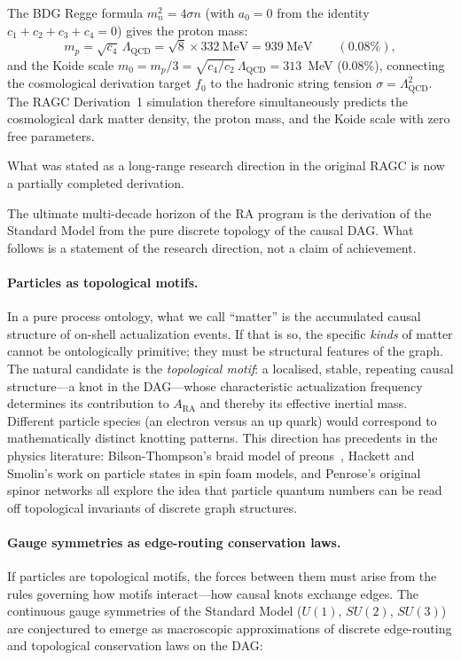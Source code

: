 \documentclass[11pt,a4paper]{article}
\theoremstyle{plain}
\theoremstyle{definition}
\theoremstyle{remark}
\begin{document}
The BDG Regge formula $m_n^2 = 4\sigma n$ (with $a_0=0$ from the identity
$c_1+c_2+c_3+c_4=0$) gives the proton mass:
\begin{equation}
  m_p = \sqrt{c_4}\,\Lambda_{\mathrm{QCD}} = \sqrt{8}\times 332~\mathrm{MeV}
  = 939~\mathrm{MeV} \qquad (0.08\%),
\end{equation}
and the Koide scale $m_0 = m_p/3 = \sqrt{c_4/c_2}\,\Lambda_{\mathrm{QCD}} = 313$~MeV ($0.08\%$),
connecting the cosmological derivation target $f_0$ to the hadronic string
tension $\sigma = \Lambda_{\mathrm{QCD}}^2$. The RAGC Derivation~1 simulation
therefore simultaneously predicts the cosmological dark matter density,
the proton mass, and the Koide scale with zero free parameters.

What was stated as a long-range research direction in the original RAGC
is now a partially completed derivation.

The ultimate multi-decade horizon of the RA program is the derivation of the
Standard Model from the pure discrete topology of the causal DAG. What follows
is a statement of the research direction, not a claim of achievement.

\paragraph{Particles as topological motifs.}
In a pure process ontology, what we call ``matter'' is the accumulated causal
structure of on-shell actualization events. If that is so, the specific
\emph{kinds} of matter cannot be ontologically primitive; they must be structural
features of the graph. The natural candidate is the \emph{topological motif}: a
localised, stable, repeating causal structure---a knot in the DAG---whose
characteristic actualization frequency determines its contribution to $A_{\mathrm{RA}}$
and thereby its effective inertial mass. Different particle species (an electron
versus an up quark) would correspond to mathematically distinct knotting patterns.
This direction has precedents in the physics literature: Bilson-Thompson's braid
model of preons~\citep{BilsonThompson2006}, Hackett and Smolin's work on particle
states in spin foam models, and Penrose's original spinor networks all explore
the idea that particle quantum numbers can be read off topological invariants of
discrete graph structures.

\paragraph{Gauge symmetries as edge-routing conservation laws.}
If particles are topological motifs, the forces between them must arise from the
rules governing how motifs interact---how causal knots exchange edges. The
continuous gauge symmetries of the Standard Model ($U(1)$, $SU(2)$, $SU(3)$)
are conjectured to emerge as macroscopic approximations of discrete edge-routing
and topological conservation laws on the DAG:
\end{document}
